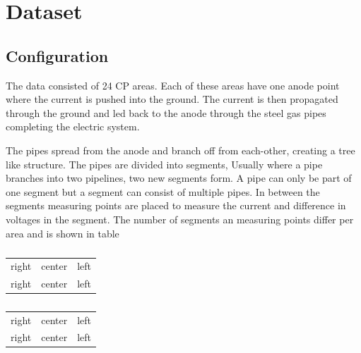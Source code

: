 
\chapter{Dataset}\label{ch:data}

\section{Configuration}
\label{sec:dataset:configuration}

The data consisted of 24 CP areas. Each of these areas have one anode point where the current is pushed into the ground. The current is then propagated through the ground and led back to the anode through the steel gas pipes completing the electric system.

The pipes spread from the anode and branch off from each-other, creating a tree like structure. The pipes are divided into segments, Usually where a pipe branches into two pipelines, two new segments form. A pipe can only be part of one segment but a segment can consist of multiple pipes. In between the segments measuring points are placed to measure the current and difference in voltages in the segment. The number of segments an measuring points differ per area and is shown in table %

\begin{table}[!htb]
\label{tab:dataset:measuring-points-per-area}
    \begin{minipage}{.5\textwidth}
        \centering
        \caption{}
        \label{tab:first}
        \begin{tabular}{rcl}
            right & center & left \\
            right & center & left 
        \end{tabular}
    \end{minipage}%
    \begin{minipage}{.5\textwidth}
        \centering
        \caption{}
        \label{tab:second}
        \begin{tabular}{rcl}
            right & center & left \\
            right & center & left 
        \end{tabular}
    \end{minipage}
\end{table}


